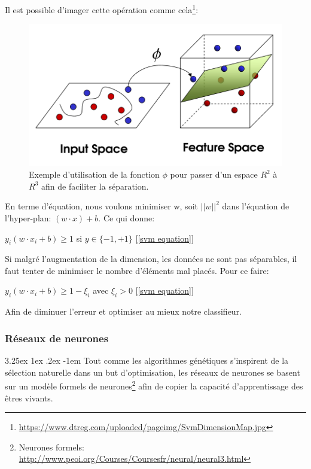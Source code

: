 \documentclass[a4paper, 11pt]{article}
\makeatletter
\renewcommand\paragraph{\@startsection{paragraph}{5}{\z@}%
  {3.25ex \@plus1ex \@minus.2ex}%
  {-1em}%
  {\normalfont\normalsize\bfseries}}
\makeatother
\begin{document}
Il est possible d'imager cette opération comme cela\footnote{\url{https://www.dtreg.com/uploaded/pageimg/SvmDimensionMap.jpg}}:
\begin{figure}[H]
\centering
\includegraphics[scale=0.3]{images/svm_exemple_phi}
\caption{Exemple d'utilisation de la fonction $\phi$ pour passer d'un espace $R^2$ à $R^3$ afin de faciliter la séparation.}
\end{figure}


En terme d'équation, nous voulons minimiser w, soit $||w||^2$ dans l'équation de l'hyper-plan: $(w \cdot x) + b$. Ce qui donne:
\begin{center}
$y_i (w \cdot x_i + b) \ge 1$ si $y \in \{-1, +1\}$ [\ref{svm equation}]
\end{center}
Si malgré l'augmentation de la dimension, les données ne sont pas séparables, il faut tenter de minimiser le nombre d'éléments mal placés. Pour ce faire:
\begin{center}
$y_i (w \cdot x_i + b) \ge 1 - \xi_i$ avec $\xi_i > 0$ [\ref{svm equation}]
\end{center}
Afin de diminuer l'erreur et optimiser au mieux notre classifieur.


\subsubsection{Réseaux de neurones}
\paragraph{}
Tout comme les algorithmes génétiques s'inspirent de la sélection naturelle dans un but d'optimisation, les réseaux de neurones se basent sur un modèle formels de neurones\footnote{Neurones formels: \url{http://www.peoi.org/Courses/Coursesfr/neural/neural3.html}} afin de copier la capacité d'apprentissage des êtres vivants.
\end{document}
